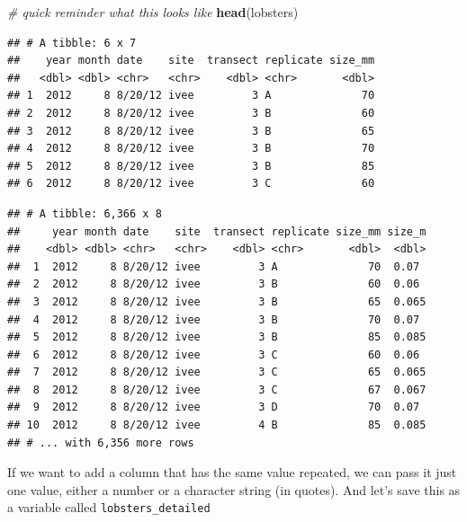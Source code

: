 \documentclass[]{book}
\newenvironment{Shaded}{\begin{snugshade}}{\end{snugshade}}
\newcommand{\CommentTok}[1]{\textcolor[rgb]{0.56,0.35,0.01}{\textit{#1}}}
\newcommand{\DataTypeTok}[1]{\textcolor[rgb]{0.13,0.29,0.53}{#1}}
\newcommand{\DecValTok}[1]{\textcolor[rgb]{0.00,0.00,0.81}{#1}}
\newcommand{\KeywordTok}[1]{\textcolor[rgb]{0.13,0.29,0.53}{\textbf{#1}}}
\newcommand{\NormalTok}[1]{#1}
\newcommand{\OperatorTok}[1]{\textcolor[rgb]{0.81,0.36,0.00}{\textbf{#1}}}
\newcommand{\StringTok}[1]{\textcolor[rgb]{0.31,0.60,0.02}{#1}}
\begin{document}
\begin{Shaded}
\begin{Highlighting}[]
\CommentTok{# quick reminder what this looks like}
\KeywordTok{head}\NormalTok{(lobsters)}
\end{Highlighting}
\end{Shaded}

\begin{verbatim}
## # A tibble: 6 x 7
##    year month date    site  transect replicate size_mm
##   <dbl> <dbl> <chr>   <chr>    <dbl> <chr>       <dbl>
## 1  2012     8 8/20/12 ivee         3 A              70
## 2  2012     8 8/20/12 ivee         3 B              60
## 3  2012     8 8/20/12 ivee         3 B              65
## 4  2012     8 8/20/12 ivee         3 B              70
## 5  2012     8 8/20/12 ivee         3 B              85
## 6  2012     8 8/20/12 ivee         3 C              60
\end{verbatim}

\begin{Shaded}
\end{Shaded}

\begin{verbatim}
## # A tibble: 6,366 x 8
##     year month date    site  transect replicate size_mm size_m
##    <dbl> <dbl> <chr>   <chr>    <dbl> <chr>       <dbl>  <dbl>
##  1  2012     8 8/20/12 ivee         3 A              70  0.07 
##  2  2012     8 8/20/12 ivee         3 B              60  0.06 
##  3  2012     8 8/20/12 ivee         3 B              65  0.065
##  4  2012     8 8/20/12 ivee         3 B              70  0.07 
##  5  2012     8 8/20/12 ivee         3 B              85  0.085
##  6  2012     8 8/20/12 ivee         3 C              60  0.06 
##  7  2012     8 8/20/12 ivee         3 C              65  0.065
##  8  2012     8 8/20/12 ivee         3 C              67  0.067
##  9  2012     8 8/20/12 ivee         3 D              70  0.07 
## 10  2012     8 8/20/12 ivee         4 B              85  0.085
## # ... with 6,356 more rows
\end{verbatim}

If we want to add a column that has the same value repeated, we can pass it just one value, either a number or a character string (in quotes). And let's save this as a variable called \texttt{lobsters\_detailed}
\end{document}
